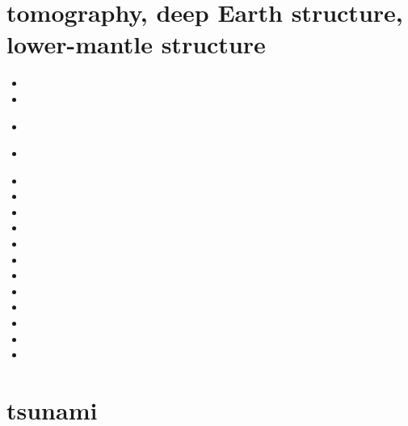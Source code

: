 \section{tomography, deep Earth structure, lower-mantle structure}
\begin{small}
\begin{itemize}
\item[\nineteeneightyone] 
\item[\nineteenninetyone] 
\item[\nineteenninetythree] 
 \\ 
\item[\nineteenninetyeight] 
 \\
\item[\twothousand] 
\item[\twothousandtwo] 
\item[\twothousandthree] 
\item[\twothousandnine] 
\item[\twothousandten] 
\item[\twothousandeleven]
\item[\twothousandtwelve]
\item[\twothousandthirteen] 
\item[\twothousandsixteen] 
\item[\twothousandeighteen] 
\item[\twothousandtwenty] 
\item[\twothousandtwentythree] 
\end{itemize}
\end{small}

\section{tsunami}

